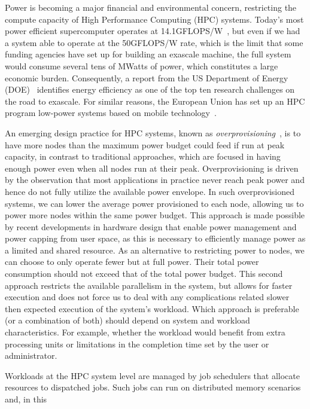 
Power is becoming a major financial and environmental concern, restricting the compute
capacity of High Performance Computing (HPC) systems.  Today's most power efficient
supercomputer operates at 14.1GFLOPS/W~\cite{Green500:2017}, but even if we had a system
able to operate at the 50GFLOPS/W rate, which is the limit that some funding agencies have
set up for building an exascale machine, the full system would consume several tens of
MWatts of power, which constitutes a large economic burden.  Consequently, a report from
the US Department of Energy (DOE)~\cite{ASCAC:tech:2014} identifies energy efficiency as
one of the top ten research challenges on the road to exascale.  For similar reasons, the
European Union has set up an HPC program %
low-power systems based on mobile technology~\cite{Rajovic2013}.
\par
An emerging design practice for HPC systems, known as 
\textit{overprovisioning}~\cite{patki:2013:eho:2464996.2465009}, is to have more nodes
than the maximum power budget could feed if run at peak capacity, in contrast to
traditional approaches, which are focused in having enough power even when all nodes run
at their peak. Overprovisioning is driven by the observation that most applications in 
practice never reach peak power and hence do not fully utilize the available power envelope. 
In such overprovisioned systems, we can lower the average power provisioned to each node, 
allowing us to power more nodes within the same power budget. This approach is made possible 
by recent developments in hardware design that enable power management and power capping from 
user space, as this is necessary to efficiently manage power as a limited and shared resource. 
As an alternative to restricting power to nodes, we can choose to only operate fewer but at 
full power. Their total power consumption should not exceed that of the total power budget. 
This second approach restricts the available parallelism in the system, but allows for faster 
execution and does not force us to deal with any complications related slower then expected 
execution of the system’s workload. Which approach is preferable (or a combination of both) 
should depend on system and workload characteristics. For example, whether the workload would 
benefit from extra processing units or limitations in the completion time set by the user
or administrator.
\par
Workloads at the HPC system level  are managed by job schedulers that allocate resources
to dispatched jobs.  Such jobs can run on distributed memory scenarios and, in this
